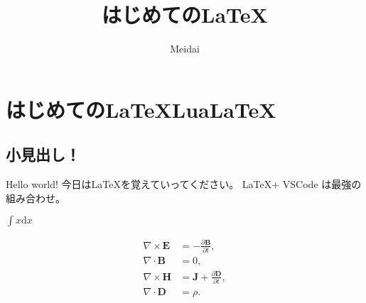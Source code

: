 \documentclass{ltjsarticle}
\begin{document}
\title{はじめての\LaTeX }
\author{Meidai}
\maketitle
  \section{はじめての\LaTeX Lua\LaTeX }
    \subsection{小見出し！}
    Hello world!
    今日は\LaTeX を覚えていってください。
    \LaTeX + VSCode は最強の組み合わせ。
    
    \(\int x \mathrm{d}x\)
    \[

    \]

    \begin{align}
      \nabla \times \bm{E} &= -\frac{\partial \bm{B}}{\partial t}, \\
      \nabla \cdot \bm{B} &= 0, \\
      \nabla \times \bm{H} &= \bm{J} + \frac{\partial \bm{D}}{\partial t}, \\
      \nabla \cdot \bm{D} &= \rho.
    \end{align}
\end{document}
